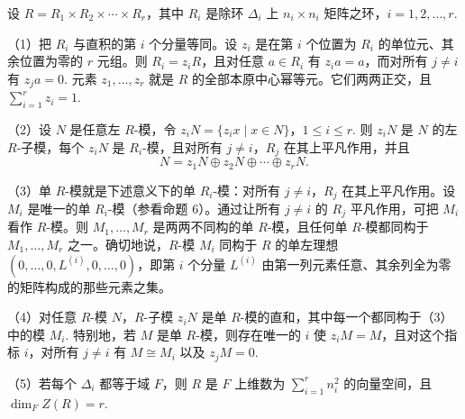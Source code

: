\begin{proposition}\label{pro:18.8}
设 \(R = R_1 \times R_2 \times \cdots \times R_r\)，其中 \(R_i\) 是除环 \(\Delta_i\) 上 \(n_i \times n_i\) 矩阵之环，\(i = 1, 2, \ldots, r\).

（1）把 \(R_i\) 与直积的第 \(i\) 个分量等同。设 \(z_i\) 是在第 \(i\) 个位置为 \(R_i\) 的单位元、其余位置为零的 \(r\) 元组。则 \(R_i = z_iR\)，且对任意 \(a \in R_i\) 有 \(z_ia = a\)，而对所有 \(j \neq i\) 有 \(z_ja = 0\). 元素 \(z_1, \ldots, z_r\) 就是 \(R\) 的全部本原中心幂等元。它们两两正交，且 \(\sum_{i=1}^{r}z_i = 1\).

（2）设 \(N\) 是任意左 \(R\)-模，令 \(z_iN = \{z_ix \mid x \in N\}\)，\(1 \leq i \leq r\). 则 \(z_iN\) 是 \(N\) 的左 \(R\)-子模，每个 \(z_iN\) 是 \(R_i\)-模，且对所有 \(j \neq i\)，\(R_j\) 在其上平凡作用，并且
\[
N = z_1N \oplus z_2N \oplus \cdots \oplus z_rN.
\]

（3）单 \(R\)-模就是下述意义下的单 \(R_i\)-模：对所有 \(j \neq i\)，\(R_j\) 在其上平凡作用。设 \(M_i\) 是唯一的单 \(R_i\)-模（参看命题 6）。通过让所有 \(j \neq i\) 的 \(R_j\) 平凡作用，可把 \(M_i\) 看作 \(R\)-模。则 \(M_1, \ldots, M_r\) 是两两不同构的单 \(R\)-模，且任何单 \(R\)-模都同构于 \(M_1, \ldots, M_r\) 之一。确切地说，\(R\)-模 \(M_i\) 同构于 \(R\) 的单左理想 \((0, \ldots, 0, L^{(i)}, 0, \ldots, 0)\)，即第 \(i\) 个分量 \(L^{(i)}\) 由第一列元素任意、其余列全为零的矩阵构成的那些元素之集。

（4）对任意 \(R\)-模 \(N\)，\(R\)-子模 \(z_iN\) 是单 \(R\)-模的直和，其中每一个都同构于（3）中的模 \(M_i\). 特别地，若 \(M\) 是单 \(R\)-模，则存在唯一的 \(i\) 使 \(z_iM = M\)，且对这个指标 \(i\)，对所有 \(j \neq i\) 有 \(M \cong M_i\) 以及 \(z_jM = 0\).

（5）若每个 \(\Delta_i\) 都等于域 \(F\)，则 \(R\) 是 \(F\) 上维数为 \(\sum_{i=1}^{r}n_i^2\) 的向量空间，且 \(\dim_FZ(R) = r\).
\end{proposition}

